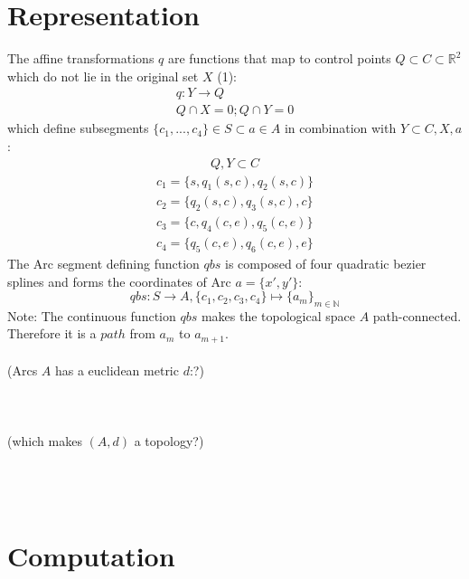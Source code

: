 \documentclass{article}
\begin{document}
\section{Representation}

The affine transformations $q$ are functions that map to control points $Q \subset C \subset \mathbb{R}^2$ which do not lie in the original set $X$ (1):
\begin{align}
q: Y \rightarrow Q\\
Q \cap X = 0; Q \cap Y = 0
\end{align}
which define subsegments $\{c_{1}, ... , c_{4}\} \in S \subset a \in A$ in combination with $Y \subset C, X,a$:
\begin{align*}
Q,Y \subset C
\end{align*}
\begin{align*}
c_{1}=\{s,q_{1}(s,c),q_{2}(s,c)\}\\
c_{2}=\{q_{2}(s,c),q_{3}(s,c),c\}\\
c_{3}=\{c,q_{4}(c,e),q_{5}(c,e)\}\\
c_{4}=\{q_{5}(c,e),q_{6}(c,e),e\}
\end{align*}
The Arc segment defining function $qbs$ is composed of four quadratic bezier splines and forms the coordinates of Arc $a=\{x',y'\}$:
\begin{equation}
qbs: S \rightarrow A, \{c_{1},c_{2},c_{3},c_{4}\} \mapsto \{a_{m}\}_{m \in \mathbb{N}}
\end{equation}
Note: The continuous function $qbs$ makes the topological space $A$ path-connected. Therefore it is a $path$ from $a_{m}$ to $a_{m+1}$. ~\cite[.3.]{Mortad}\\\\
(Arcs $A$ has a euclidean metric $d$:?)\\\\\\\\
(which makes $(A,d)$ a topology?)\\\\\\\\

\section{Computation}

\iffalse
\begin{equation} 
\forall u,v \in V :
d(u,v) = 
\begin{cases}
0,  u=v \\
1,  u \neq v 
\end{cases}
\end{equation}
\fi

\printbibliography
\end{document}
